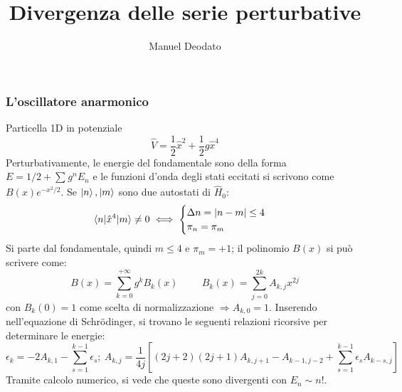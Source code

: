 \documentclass[10pt]{beamer}
\title{Divergenza delle serie perturbative}
\author{Manuel Deodato}
\institute
{
  Università di Pisa
}
\date{}
\begin{document}
\firstpage %

\footnotesize
\begin{frame}
	\frametitle{L'oscillatore anarmonico}
Particella 1D in potenziale 
\begin{equation*}
	\hat{V} = \frac{1}{2}\hat{x}^2 + \frac{1}{2}g \hat{x}^4
\end{equation*}
Perturbativamente, le energie del fondamentale sono della forma $E = 1/2 + \sum_{}^{} g^n E_n$ e le funzioni d'onda degli stati eccitati si scrivono come $B(x) e^{-x^2 / 2} $.
Se $\ket{n} , \ket{m} $ sono due autostati di $\hat{H}_0$:
\begin{equation*}
	\braket{n |\hat{x}^4|m} \neq 0 \iff \begin{cases}
		\Delta n= |n-m| \le  4\\
		\pi_n = \pi_m
	\end{cases}
\end{equation*}
Si parte dal fondamentale, quindi $m\le 4$ e $\pi_m= +1$; il polinomio $B(x)$ si pu\`o scrivere come:
\begin{equation*}
	B(x) = \sum_{k=0}^{+\infty} g^k B_k(x) \hspace{1cm} B_k(x)= \sum_{j=0}^{2k} A_{k,j} x^{2j} 
\end{equation*}
con $B_k(0)=1$ come scelta di normalizzazione $\Rightarrow A_{k,0} =1$.
Inserendo nell'equazione di Schr\"odinger, si trovano le seguenti relazioni ricorsive per determinare le energie:
\begin{equation*}
		\epsilon _k = - 2A_{k,1}  - \sum_{s=1}^{k-1} \epsilon _s; \ A_{k,j} = \frac{1}{4j} \left[ (2j+2)(2j+1) A_{k,j+1} - A_{k-1,j-2} + \sum_{s=1}^{k-1} \epsilon _s A_{k-s,j}  \right] 
\end{equation*}
Tramite calcolo numerico, si vede che queste sono divergenti con $E_n \sim n!$.
\end{frame}
\end{document}

